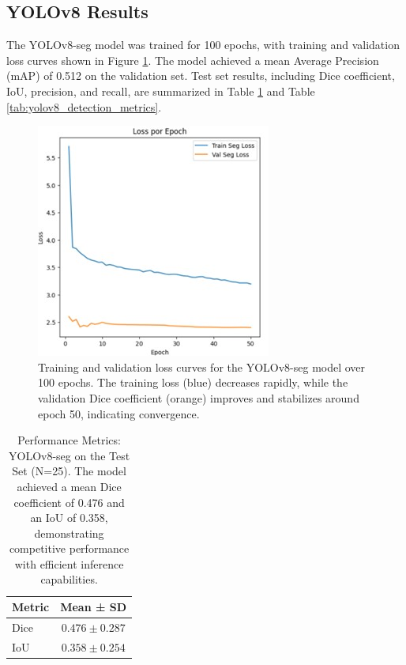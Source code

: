 \documentclass[12pt]{article}
\begin{document}
\subsection{YOLOv8 Results} \label{subsec:yolov8}

The YOLOv8-seg model was trained for 100 epochs, with training and validation loss curves shown in Figure \ref{fig:yolov8_loss_curve}. The model achieved a mean Average Precision (mAP) of 0.512 on the validation set. Test set results, including Dice coefficient, IoU, precision, and recall, are summarized in Table \ref{tab:yolov8_metrics} and Table \ref{tab:yolov8_detection_metrics}.

\begin{figure}[tp]
    \centering
    \includegraphics[width=.7\textwidth]{figures/Figure 5.jpg}
    \caption{Training and validation loss curves for the YOLOv8-seg model over 100 epochs. The training loss (blue) decreases rapidly, while the validation Dice coefficient (orange) improves and stabilizes around epoch 50, indicating convergence.}
    \label{fig:yolov8_loss_curve}
\end{figure}

\begin{table}[tp]
\centering
\begin{tabular}{lc}
\toprule
\textbf{Metric} & \textbf{Mean ± SD} \\
\midrule
Dice & $0.476 \pm 0.287$ \\
IoU & $0.358 \pm 0.254$ \\
\bottomrule
\end{tabular}
\caption{Performance Metrics: YOLOv8-seg on the Test Set (N=25). The model achieved a mean Dice coefficient of 0.476 and an IoU of 0.358, demonstrating competitive performance with efficient inference capabilities.}
\label{tab:yolov8_metrics}
\end{table}
\end{document}

